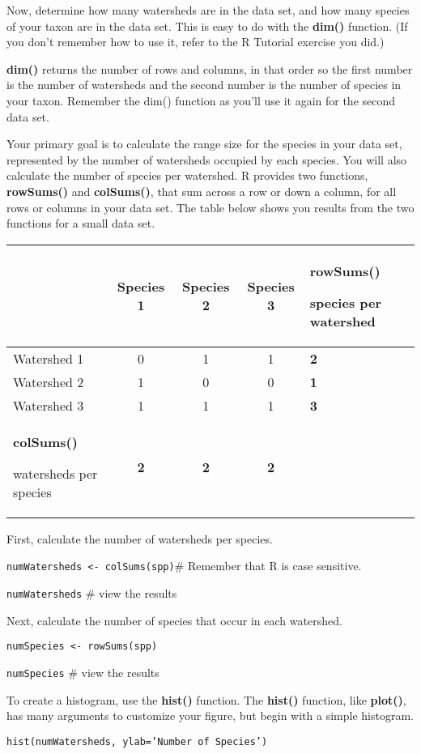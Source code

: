 \documentclass[11pt]{article}
\begin{document}
Now, determine how many watersheds are in the data set, and how many
species of your taxon are in the data set. This is easy to do with the
\textbf{dim()} function. (If you don't remember how to use it, refer to
the R Tutorial exercise you did.)

\textbf{dim()} returns the number of rows and columns, in that order so
the first number is the number of watersheds and the second number is
the number of species in your taxon. Remember the dim()
function as you'll use it again for the second data set.

Your primary goal is to calculate the range size for the species in your
data set, represented by the number of watersheds occupied by each
species. You will also calculate the number of species per watershed. R
provides two functions, \textbf{rowSums()} and \textbf{colSums()}, that
sum across a row or down a column, for all rows or columns in your data
set. The table below shows you results from the two functions for a
small data set.

\label{tab:colrowsums}
\begin{longtable}[c]{@{}L{1.5in}cccC{1.5in}@{}}
\toprule
& Species 1 & Species 2 & Species 3 & \textbf{rowSums()}

species per watershed\tabularnewline
\midrule
\endhead
Watershed 1 & 0 & 1 & 1 & \textbf{2}\tabularnewline
Watershed 2 & 1 & 0 & 0 & \textbf{1}\tabularnewline
Watershed 3 & 1 & 1 & 1 & \textbf{3}\tabularnewline
\textbf{colSums()}

watersheds per species & \textbf{2} & \textbf{2} & \textbf{2}
&\tabularnewline
\bottomrule
\end{longtable}

First, calculate the number of watersheds per species.

\texttt{numWatersheds \textless{}- colSums(spp)}\qquad \# Remember that R is case
sensitive.

\texttt{numWatersheds} \qquad \# view the results

Next, calculate the number of species that occur in each watershed.

\texttt{numSpecies \textless{}- rowSums(spp)}

\texttt{numSpecies} \qquad \# view the results

To create a histogram, use the \textbf{hist()} function. The
\textbf{hist()} function, like \textbf{plot()}, has many arguments to
customize your figure, but begin with a simple histogram.

\texttt{hist(numWatersheds, ylab='Number of Species')}
\end{document}

